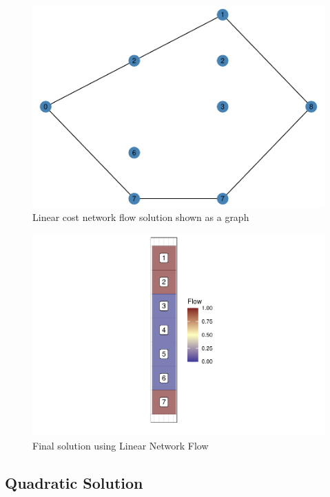 \documentclass[]{article}
\begin{document}
\begin{figure}
\centering
\includegraphics{TagetBasedNew_files/figure-latex/LinearGraphNEt-1.pdf}
\caption{\label{fig:LinearGraphNEt}Linear cost network flow solution shown as a graph}
\end{figure}

\begin{figure}
\centering
\includegraphics{TagetBasedNew_files/figure-latex/FinalSolution-1.pdf}
\caption{\label{fig:FinalSolution}Final solution using Linear Network Flow}
\end{figure}

\hypertarget{quadratic-solution}{%
\subsection{Quadratic Solution}\label{quadratic-solution}}
\end{document}

